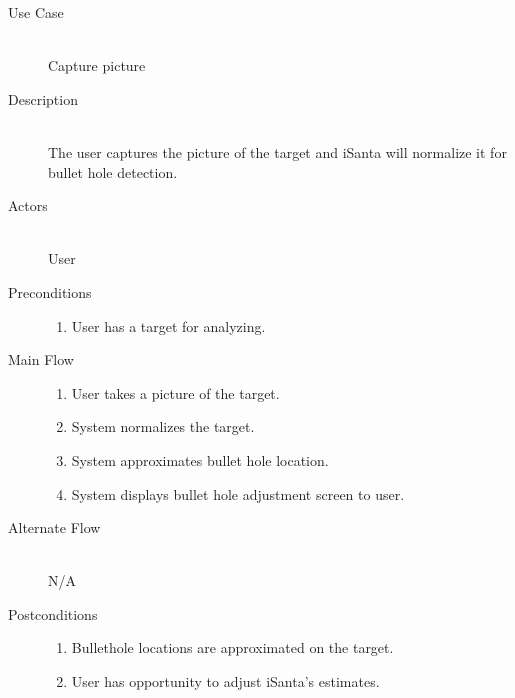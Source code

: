 \begin{description}
    \item[Use Case] \hfill \\
        Capture picture
    \item[Description] \hfill \\
        The user captures the picture of the target and iSanta will normalize it for bullet hole detection.
    \item[Actors] \hfill \\
        User
    \item[Preconditions] \hfill 
        \begin{enumerate}
            \item User has a target for analyzing.
        \end{enumerate}
    \item[Main Flow] \hfill 
        \begin{enumerate}
            \item User takes a picture of the target.
            \item System normalizes the target.
            \item System approximates bullet hole location.
            \item System displays bullet hole adjustment screen to user.
        \end{enumerate}
    \item[Alternate Flow] \hfill \\
        N/A
    \item[Postconditions]
        \begin{enumerate}
            \item Bullethole locations are approximated on the target.
            \item User has opportunity to adjust iSanta's estimates.
        \end{enumerate}
\end{description}

